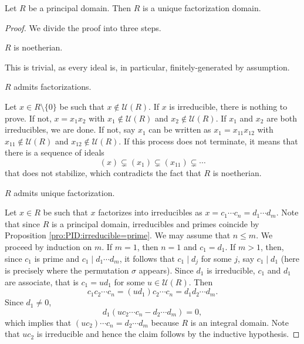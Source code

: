 \begin{theorem}
\label{thm:PID=>UFD}
	Let $R$ be a principal domain. 
	Then $R$ is a unique factorization domain.
\end{theorem}

\begin{proof}
	We divide the proof into three steps. 
	\begin{claim}
		$R$ is noetherian. 	
	\end{claim}
	
	This is trivial, as every ideal is, in particular, finitely-generated by assumption.   

	\begin{claim}
		$R$ admits factorizations. 	
	\end{claim}
	
	Let $x\in R\setminus\{0\}$ be such that $x\not\in\mathcal{U}(R)$. If $x$ is irreducible, 
	there is nothing to prove. If not, $x=x_1x_2$ with $x_1\not\in\mathcal{U}(R)$ and
	$x_2\not\in\mathcal{U}(R)$. If $x_1$ and $x_2$ are both irreducibles, 
	we are done. If not, say $x_1$ can be written as $x_1=x_{11}x_{12}$ with
	$x_{11}\not\in\mathcal{U}(R)$ and $x_{12}\not\in\mathcal{U}(R)$. If this process
	does not terminate, it means that there is a sequence of ideals
	\[
	(x)\subsetneq (x_1)\subsetneq (x_{11})\subsetneq\cdots 
	\]
	that does not stabilize, which contradicts the fact that $R$ is noetherian.  
	
	\begin{claim}
		$R$ admits unique factorization.	
	\end{claim}
	
	Let $x\in R$ be such that $x$ factorizes into irreducibles as 
	$x=c_1\cdots c_n=d_1\cdots d_m$. 
	Note that since $R$ is a principal domain, irreducibles and primes coincide by 
	Proposition \ref{pro:PID:irreducible=prime}. 
	We may assume that $n\leq m$. We proceed by 
	induction on $m$. If $m=1$, then 
	$n=1$ and $c_1=d_1$. If $m>1$, then, since $c_1$ is prime and 
	$c_1\mid d_1\cdots d_m$, it follows that $c_1\mid d_j$ for some $j$, 
	say $c_1\mid d_1$ (here is precisely where the permutation $\sigma$ appears). Since
	$d_1$ is irreducible, $c_1$ and $d_1$ are associate, that is
	$c_1=ud_1$ for some $u\in\mathcal{U}(R)$. Then
	\[
	c_1c_2\cdots c_n=(ud_1)c_2\cdots c_n=d_1d_2\cdots d_m. 
	\]
	Since $d_1\ne 0$,  
	\[
	d_1(uc_2\cdots c_n-d_2\cdots d_m)=0,
	\]
	which implies that $(uc_2)\cdots c_n=d_2\cdots d_m$ because $R$ is an integral domain. Note
	that $uc_2$ is irreducible and hence 
	the claim follows by the inductive hypothesis. 
\end{proof}

